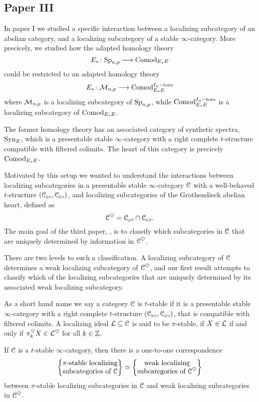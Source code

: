 \subsection{Paper III}

In paper I we studied a specific interaction between a localizing subcategory of an abelian category, and a localizing subcategory of a stable $\infty$-category. More precicely, we studied how the adapted homology theory 
\[E_* \colon \mathrm{Sp}_{n,p} \longrightarrow \mathrm{Comod}_{E_*E}\]
could be restricted to an adapted homology theory 
\[E_* \colon \mathcal{M}_{n,p} \longrightarrow \mathrm{Comod}_{E_*E}^{I_n-\mathrm{tors}}\] 
where $\mathcal{M}_{n,p}$ is a localizing subcategory of $\mathrm{Sp}_{n,p}$, while $\mathrm{Comod}_{E_*E}^{I_n-\mathrm{tors}}$ is a localizing subcategory of $\mathrm{Comod}_{E_*E}$. 

The former homology theory has an associated category of synthetic spectra, $\mathrm{Syn}_{E}$, which is a presentable stable $\infty$-category with a right complete $t$-structure compatible with filtered colimits. The heart of this category is precicely $\mathrm{Comod}_{E_*E}$. 

Motivated by this setup we wanted to understand the interactions between localizing subcategories in a presentable stable $\infty$-category $\EuScript{C}$ with a well-behaved $t$-structure $(\EuScript{C}_{\hspace{-1pt}\scriptscriptstyle\geqslant 0}, \EuScript{C}_{\hspace{-1pt}\scriptscriptstyle\leqslant 0})$, and localizing subcategories of the Grothendieck abelian heart, defined as 
\[\EuScript{C}^\heartsuit = \EuScript{C}_{\hspace{-1pt}\scriptscriptstyle\geqslant 0}\cap \EuScript{C}_{\hspace{-1pt}\scriptscriptstyle\leqslant 0}.\]
The main goal of the third paper, \cite{aambo_2024_localizing}, is to classify which subcategories in $\EuScript{C}$ that are uniquely determined by information in $\EuScript{C}^\heartsuit$. 

There are two levels to such a classification. A localizing subcategory of $\EuScript{C}$ determines a weak localizing subcategory of $\EuScript{C}^\heartsuit$, and our first result attempts to classify which of the localizing subcategories that are uniquely determined by its associated weak localizing subcategory. 

As a short hand name we say a category $\EuScript{C}$ is $t$-stable if it is a presentable stable $\infty$-category with a right complete $t$-structure $(\EuScript{C}_{\hspace{-1pt}\scriptscriptstyle\geqslant 0}, \EuScript{C}_{\hspace{-1pt}\scriptscriptstyle\leqslant 0})$, that is compatible with filtered colimits. A localizing ideal $\mathcal{L}\subseteq \EuScript{C}$ is said to be $\pi$-stable, if $X\in \mathcal{L}$ if and only if $\pi_k^\heartsuit X \in \mathcal{L}^\heartsuit$ for all $k\in \mathbb{Z}$.  

\begin{theorem}
    If $\EuScript{C}$ is a $t$-stable $\infty$-category, then there is a one-to-one correspondence
    \[\left\{ \begin{matrix} \pi\text{-stable localizing}\\ \text{subcategories of }\EuScript{C} \end{matrix} \right\} \simeq \left\{ \begin{matrix} \text{weak localizing}\\ \text{subcategories of }\EuScript{C}^\heartsuit \end{matrix} \right\}\]
    between $\pi$-stable localizing subcategories in $\EuScript{C}$ and weak localizing subcategories in $\EuScript{C}^\heartsuit$. 
\end{theorem}

